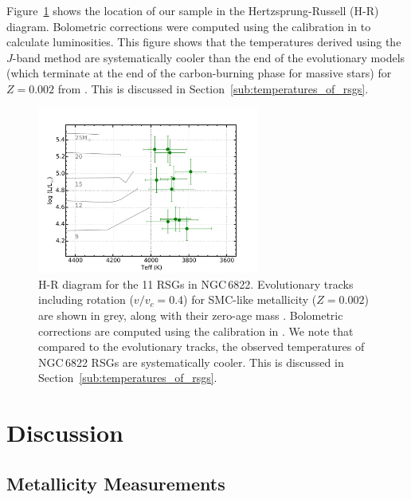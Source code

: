 Figure~\ref{fig:6822HRD} shows the location of our sample in the Hertzsprung-Russell (H-R) diagram.
Bolometric corrections were computed using the calibration in
\cite{2013ApJ...767....3D} to calculate luminosities.
This figure shows that the temperatures derived using the $J$-band method are systematically cooler than the end of the evolutionary models (which terminate at the end of the carbon-burning phase for massive stars) for
$Z=0.002$ from
\cite{2013A&A...558A.103G}.
This is discussed in Section~\ref{sub:temperatures_of_rsgs}.


\begin{figure}
 \centering
\includegraphics[width=0.65\textwidth]{ngc6822/N6822_HRD}
\caption{
H-R diagram for the 11 RSGs in NGC\,6822.
Evolutionary tracks including rotation
($v/v_{c} = 0.4$) for SMC-like metallicity ($Z=0.002$)
are shown in grey, along with their zero-age mass
\protect\citep{2013A&A...558A.103G}.
Bolometric corrections are computed using the calibration in
\protect\cite{2013ApJ...767....3D}.
We note that compared to the evolutionary tracks,
the observed temperatures of NGC\,6822 RSGs are systematically cooler.
This is discussed in Section~\ref{sub:temperatures_of_rsgs}.
}
\label{fig:6822HRD}
\end{figure}



\section{Discussion} %
\label{sec:discussion}

\subsection{Metallicity Measurements} %
\label{sub:metallicity_measurements}

